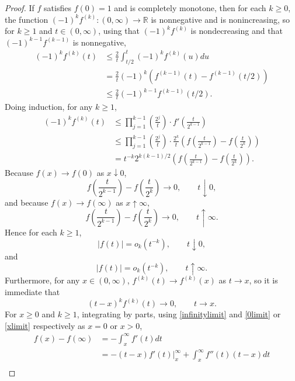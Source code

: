\documentclass{article}
\theoremstyle{definition}
\begin{document}
\begin{proof}
If $f$ satisfies $f(0)=1$ and is completely monotone, then for each $k \geq 0$, 
the function $(-1)^{k} f^{(k)}:(0,\infty) \to \mathbb{R}$ is nonnegative and is nonincreasing, so for $k \geq 1$ and
$t \in (0,\infty)$, using that $(-1)^k f^{(k)}$ is nondecreasing and that
$(-1)^{k-1} f^{(k-1)}$ is nonnegative,
\begin{align*}
(-1)^k f^{(k)}(t)&\leq \frac{2}{t} \int_{t/2}^t (-1)^k f^{(k)}(u) du\\
&=\frac{2}{t} (-1)^k \left(f^{(k-1)}(t)-f^{(k-1)}(t/2)\right)\\
&\leq \frac{2}{t} (-1)^{k-1} f^{(k-1)}(t/2).
\end{align*}
Doing induction, for any $k \geq 1$,
\begin{align*}
(-1)^k f^{(k)}(t)&\leq \prod_{j=1}^{k-1} \left(\frac{2^j}{t}\right) \cdot f'\left(\frac{t}{2^{k-1}}\right)\\
&\leq  \prod_{j=1}^{k-1} \left(\frac{2^j}{t}\right) \cdot \frac{2^k}{t}  \left(f\left(\frac{t}{2^{k-1}}\right)-f\left(\frac{t}{2^{k}}\right)\right)\\
&=t^{-k} 2^{k(k-1)/2}  \left(f\left(\frac{t}{2^{k-1}}\right)-f\left(\frac{t}{2^{k}}\right)\right).
\end{align*}
Because $f(x) \to f(0)$ as $x \downarrow 0$,
\[
f\left(\frac{t}{2^{k-1}}\right)-f\left(\frac{t}{2^{k}}\right) \to 0,\qquad t \downarrow 0,
\]
and because $f(x) \to f(\infty)$ as $x \uparrow \infty$,
\[
f\left(\frac{t}{2^{k-1}}\right)-f\left(\frac{t}{2^{k}}\right) \to 0,\qquad t \uparrow \infty.
\]
Hence for each $k \geq 1$,
\begin{equation}
|f(t)| = o_k(t^{-k}), \qquad t \downarrow 0,
\label{0limit}
\end{equation}
and
\begin{equation}
|f(t)| = o_k(t^{-k}),\qquad t \uparrow \infty.
\label{infinitylimit}
\end{equation}
Furthermore, for any $x \in (0,\infty)$, $f^{(k)}(t) \to f^{(k)}(x)$ as $t \to x$, so it is immediate that
\begin{equation}
(t-x)^k f^{(k)}(t) \to 0,\qquad t \to x.
\label{xlimit}
\end{equation}
For $x \geq 0$ and $k \geq 1$,
integrating by parts, using  \eqref{infinitylimit} and \eqref{0limit} or  \eqref{xlimit} 
respectively as $x=0$ or $x>0$,
\begin{align*}
f(x)-f(\infty)&=-\int_x^\infty f'(t) dt\\
&=-(t-x)f'(t)\Big|_x^\infty + \int_x^\infty f''(t) (t-x) dt\\

\end{align*}
\end{proof}
\end{document}
